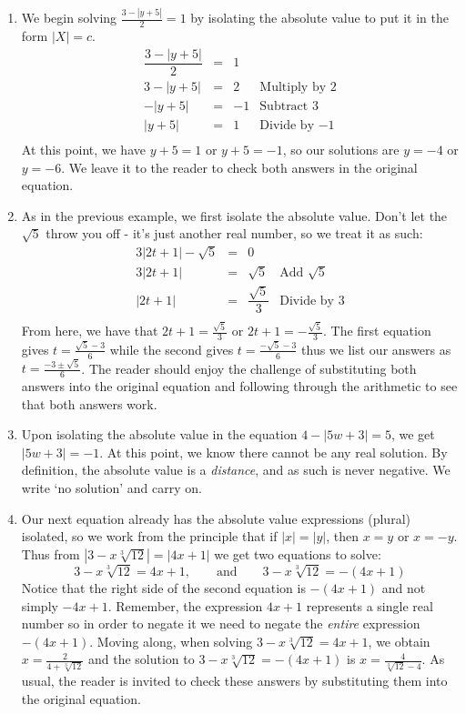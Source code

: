 \documentclass{ximera}
\begin{document}
\begin{example}
\begin{enumerate}
\item  We begin solving  $\frac{3 - |y+5|}{2} = 1$ by isolating the absolute value to put it in the form $|X| = c$.\[ \begin{array}{rclr}
\dfrac{3 - |y+5|}{2} & = & 1 &  \\
3 - |y+5| & = & 2 & \text{Multiply by $2$}\\
-|y+5| & = & -1 & \text{Subtract $3$} \\
|y+5| & = & 1 & \text{Divide by $-1$}  \\ 

\end{array} \] At this point, we have $y+5 = 1$ or $y+5 = -1$, so our solutions are $y = -4$ or $y = -6$.  We leave it to the reader to check both answers in the original equation.

\item As in the previous example, we first isolate the absolute value.  Don't let the $\sqrt{5}$ throw you off - it's just another real number, so we treat it as such:\[ \begin{array}{rclr}

 3|2t+1| - \sqrt{5} & = & 0 & \\
 3|2t+1|  & = &  \sqrt{5} & \text{Add $\sqrt{5}$} \\
 |2t + 1| & = & \dfrac{\sqrt{5}}{3} & \text{Divide by $3$}\\
\end{array} \] From here, we have that $2t+1 = \frac{\sqrt{5}}{3}$ or $2t+1 = -\frac{\sqrt{5}}{3}$. The first equation gives $t = \frac{\sqrt{5}-3}{6}$ while the second gives $t = \frac{-\sqrt{5}-3}{6}$ thus we list our answers as $t = \frac{-3 \pm \sqrt{5}}{6}$.   The reader should enjoy the challenge of substituting both answers into the original equation and following through the arithmetic to see that both answers work.

\item  Upon isolating the absolute value in the equation $4 - |5w+3| = 5$, we get $|5w+3| = -1$.  At this point, we know there cannot be any real solution.  By definition, the absolute value is a \textit{distance}, and as such is never negative.  We write `no solution' and carry on.

\item Our next equation already has the absolute value expressions (plural) isolated, so we work from the principle that if $|x| = |y|$, then $x = y$ or $x = -y$. Thus from $\left|3 - x \sqrt[3]{12}\right| = |4x+1|$ we get two equations to solve:  \[ 3 - x \sqrt[3]{12} = 4x+1, \qquad \text{and} \qquad 3 - x \sqrt[3]{12} = -(4x+1) \] Notice that the right side of the second equation is $-(4x+1)$ and not simply $-4x+1$.  Remember, the expression $4x+1$ represents a single real number so in order to negate it we need to negate the \textit{entire} expression $-(4x+1)$. Moving along, when solving $3 - x \sqrt[3]{12} = 4x+1$, we obtain $x = \frac{2}{4 + \sqrt[3]{12}}$ and the solution to $3 - x \sqrt[3]{12} = -(4x+1)$ is $x = \frac{4}{\sqrt[3]{12}-4}$.  As usual, the reader is invited to check these answers by substituting them into the original equation.


\end{enumerate}
\end{example}
\end{document}
